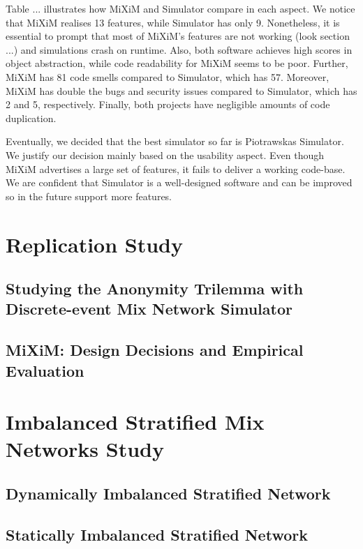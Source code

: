\documentclass[logo,msc,cyber]{infthesis}   %
\begin{document}
Table ... illustrates how MiXiM and Simulator compare in each aspect. We notice
that MiXiM realises 13 features, while Simulator has only 9. Nonetheless, it is
essential to prompt that most of MiXiM's features are not working (look section
...) and simulations crash on runtime. Also, both software achieves high scores
in object abstraction, while code readability for MiXiM seems to be poor.
Further, MiXiM has 81 code smells compared to Simulator, which has 57. Moreover,
MiXiM has double the bugs and security issues compared to Simulator, which has 2
and 5, respectively. Finally, both projects have negligible amounts of code
duplication.

Eventually, we decided that the best simulator so far is Piotrawskas Simulator.
We justify our decision mainly based on the usability aspect. Even though MiXiM
advertises a large set of features, it fails to deliver a working code-base. We
are confident that Simulator is a well-designed software and can be improved so
in the future support more features. 

\chapter{Replication Study}

\section{Studying the Anonymity Trilemma with Discrete-event Mix Network Simulator}

\section{MiXiM: Design Decisions and Empirical Evaluation}

\chapter{Imbalanced Stratified Mix Networks Study}

\section{Dynamically Imbalanced Stratified Network}

\section{Statically Imbalanced Stratified Network}
\end{document}
